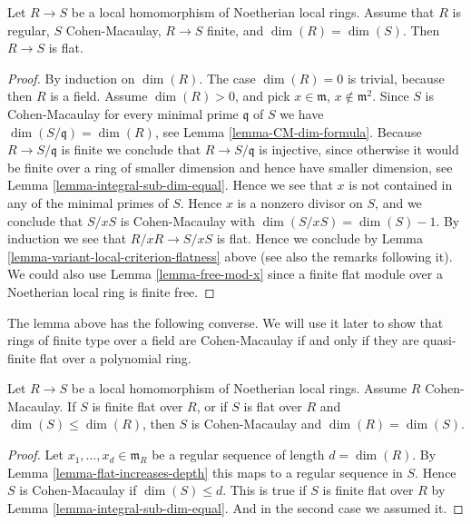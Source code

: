 \begin{lemma}
\label{lemma-CM-over-regular-flat}
Let $R \to S$ be a local homomorphism of Noetherian local
rings. Assume that $R$ is regular, $S$ Cohen-Macaulay,
$R \to S$ finite, and $\dim(R) = \dim(S)$. Then $R \to S$ is
flat.
\end{lemma}

\begin{proof}
By induction on $\dim(R)$. The case $\dim(R) = 0$ is trivial, because
then $R$ is a field. Assume $\dim(R) > 0$, and pick
$x \in \mathfrak m$, $x \not \in \mathfrak m^2$. Since $S$ is Cohen-Macaulay
for every minimal prime $\mathfrak q$ of $S$ we have
$\dim(S/\mathfrak q) = \dim(R)$, see Lemma \ref{lemma-CM-dim-formula}.
Because $R \to S/\mathfrak q$ is
finite we conclude that $R \to S/\mathfrak q$ is injective,
since otherwise it would be finite over a ring of smaller dimension
and hence have smaller dimension, see Lemma \ref{lemma-integral-sub-dim-equal}.
Hence we see that $x$ is not contained in any of the minimal
primes of $S$. Hence $x$ is a nonzero divisor on $S$, and we conclude
that $S/xS$ is Cohen-Macaulay with $\dim(S/xS) = \dim(S) - 1$.
By induction we see that $R/xR \to S/xS$ is flat. Hence we
conclude by Lemma \ref{lemma-variant-local-criterion-flatness} above
(see also the remarks following it). We could also use
Lemma \ref{lemma-free-mod-x} since a finite flat module over a
Noetherian local ring is finite free.
\end{proof}

\noindent
The lemma above has the following converse. We will use it later
to show that rings of finite type over a field are Cohen-Macaulay
if and only if they are quasi-finite flat over a polynomial ring.

\begin{lemma}
\label{lemma-finite-flat-over-regular-CM}
Let $R \to S$ be a local homomorphism of Noetherian local rings.
Assume $R$ Cohen-Macaulay.
If $S$ is finite flat over $R$, or if $S$ is flat over $R$ and
$\dim(S) \leq \dim(R)$, then $S$ is Cohen-Macaulay and $\dim(R) = \dim(S)$.
\end{lemma}

\begin{proof}
Let $x_1, \ldots, x_d \in \mathfrak m_R$ be a regular sequence
of length $d = \dim(R)$. By Lemma \ref{lemma-flat-increases-depth}
this maps to a regular sequence in $S$.
Hence $S$ is Cohen-Macaulay if $\dim(S) \leq d$. This is true
if $S$ is finite flat over $R$ by Lemma \ref{lemma-integral-sub-dim-equal}.
And in the second case we assumed it.
\end{proof}

